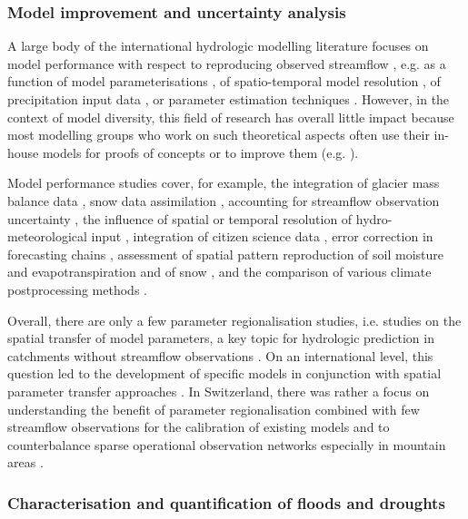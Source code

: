 \documentclass[10pt,a4paper]{article}
\begin{document}
\subsubsection{Model improvement and uncertainty analysis}
\label{sec:context:uncertainty}

A large body of the international hydrologic modelling literature focuses on model performance with respect to reproducing observed streamflow \citep{Clark2011a, Beven2011}, e.g. as a function of model parameterisations \citep{GironsLopez2020}, of spatio-temporal model resolution \citep{Brunner2019}, of precipitation input data \citep{Sikorska2016, Sikorska2017, MullerThomy2019}, or parameter estimation techniques \citep{Foglia2009, Cullmann2011}. However, in the context of model diversity, this field of research has overall little impact because most modelling groups who work on such theoretical aspects often use their in-house models for proofs of concepts or to improve them (e.g. \citealt{Schaefli2007, Hingray2010}).

Model performance studies cover, for example, the integration of glacier mass balance data \citep{Finger2015, Schaefli2011}, snow data assimilation \citep{Griessinger2016}, accounting for streamflow observation uncertainty \citep{Westerberg2020}, the influence of spatial or temporal resolution of hydro-meteorological input \citep{GironsLopez2016, Felder2017, Sikorska2018}, integration of citizen science data \citep{Etter2020}, error correction in forecasting chains \citep{Bogner2018}, assessment of spatial pattern reproduction of soil moisture and evapotranspiration \citep{Rossler2010, Zappa2003} and of snow \citep{Zappa2008a}, and the comparison of various climate postprocessing methods \citep{Rossler2019}.

Overall, there are only a few parameter regionalisation studies, i.e. studies on the spatial transfer of model parameters, a key topic for hydrologic prediction in catchments without streamflow observations \citep{Guo2021}. On an international level, this question led to the development of specific models in conjunction with spatial parameter transfer approaches \citep[e.g., mHM;][]{Samaniego2010a}. In Switzerland, there was rather a focus on understanding the benefit of parameter regionalisation combined with few streamflow observations for the calibration of existing models and to counterbalance sparse operational observation networks especially in mountain areas \citep{Viviroli2015}.


\subsubsection{Characterisation and quantification of floods and droughts}
\label{sec:context:floodsdroughts}
\end{document}
